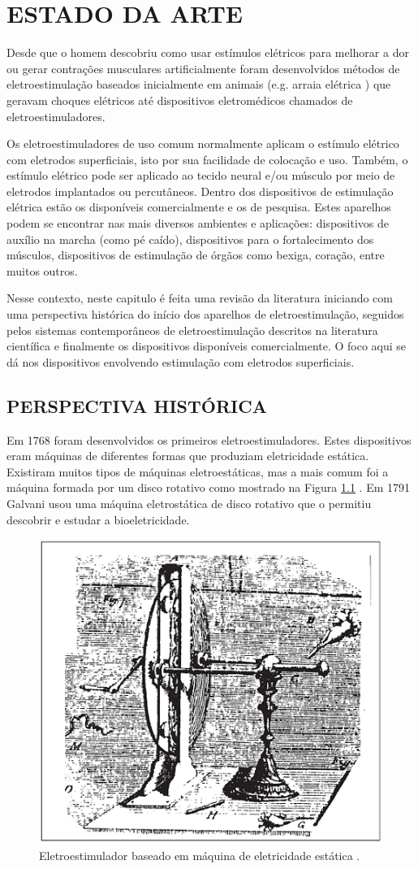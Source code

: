 \chapter{ESTADO DA ARTE}\label{sec:cap3}

\vspace{1cm}
Desde que o homem descobriu como usar estímulos elétricos para melhorar a dor ou gerar contrações musculares artificialmente foram desenvolvidos métodos de eletroestimulação baseados inicialmente em animais (e.g. arraia elétrica \cite{Heidland2013}) que geravam choques elétricos até dispositivos eletromédicos chamados de eletroestimuladores. 

Os eletroestimuladores de uso comum normalmente aplicam o estímulo elétrico com eletrodos superficiais, isto por sua facilidade de colocação e uso. Também, o estímulo elétrico pode ser aplicado ao tecido neural e/ou músculo por meio de eletrodos implantados ou percutâneos. Dentro dos dispositivos de estimulação elétrica estão os disponíveis comercialmente e os de pesquisa. Estes aparelhos podem se encontrar nas mais diversos ambientes e aplicações: dispositivos de auxílio na marcha (como pé caído), dispositivos para o fortalecimento dos músculos, dispositivos de estimulação de órgãos como bexiga, coração, entre muitos outros.

Nesse contexto, neste capitulo é feita uma revisão da literatura iniciando com uma perspectiva histórica do início dos aparelhos de eletroestimulação, seguidos pelos sistemas contemporâneos de eletroestimulação descritos na literatura científica e finalmente os dispositivos disponíveis comercialmente. O foco aqui se dá nos dispositivos envolvendo estimulação com eletrodos superficiais.


\section{PERSPECTIVA HISTÓRICA}

Em 1768 foram desenvolvidos os primeiros eletroestimuladores. Estes dispositivos eram máquinas de diferentes formas que produziam eletricidade estática. Existiram muitos tipos de máquinas eletroestáticas, mas a mais comum foi a máquina formada por um disco rotativo como mostrado na Figura \ref{fig:ma_f1} \cite{Geddes1994}. Em 1791 Galvani usou uma máquina eletrostática de disco rotativo que o permitiu descobrir e estudar a bioeletricidade.

\begin{figure}
    \centering %
    \includegraphics[width=0.4\linewidth]{figs/Fig_c3/ma_f1}
    \caption{Eletroestimulador baseado em máquina de eletricidade estática \cite{Geddes1994}.}
    \label{fig:ma_f1}
\end{figure}

